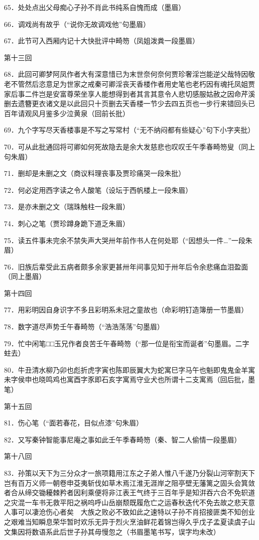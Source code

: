 65．处处点出父母痴心子孙不肖此书纯系自愧而成{（\kaishu 墨眉）}

66．调戏尚有故乎{（\kaishu ``说你无故调戏他''句墨眉）}

67．此节可入西厢内记十大快批评中畸笏{（\kaishu 凤姐泼粪一段墨眉）}

第十三回

68．此回可卿梦阿凤作者大有深意惜已为末世奈何奈何贾珍奢淫岂能逆父哉特因敬老不管然后恣意足为世家之戒秦可卿淫丧天香楼作者用史笔也老朽因有魂托凤姐贾家后事二件岂是安富尊荣坐享人能想得到者其言其意令人悲切感服姑赦之因命芹溪删去遗簪更衣诸文是以此回只十页删去天香楼一节少去四五页也一步行来错回头已百年请观风月鉴多少泣黄泉{（\kaishu 回前长批）}

69．九个字写尽天香楼事是不写之写常村{（\kaishu ``无不纳闷都有些疑心''句下小字夹批）}

70．可从此批通回将可卿如何死故隐去是余大发慈悲也叹叹壬午季春畸笏叟{（\kaishu 同上句朱眉）}

71．删却是未删之文{（\kaishu 商议料理丧事及贾珍痛哭一段朱批）}

72．何必定用西字读之令人酸笔{（\kaishu 设坛于西帆楼上一段朱眉）}

73．是亦未删之文{（\kaishu 瑞珠触柱一段朱眉）}

74．刺心之笔{（\kaishu 贾珍蹲身跪下道乏朱眉）}

75．读五件事未完余不禁失声大哭卅年前作书人在何处耶{（\kaishu ``因想头一件\ldots{}''一段朱眉）}

76．旧族后辈受此五病者颇多余家更甚卅年间事见知于卅年后令余悲痛血泪盈面{（\kaishu 同上墨眉）}

第十四回

77．用彩明因自身识字不多且彩明系未冠之童故也{（\kaishu 命彩明钉造簿册一节墨眉）}

78．数字道尽声势壬午春畸笏{（\kaishu ``浩浩荡荡''句墨眉）}

79．忙中闲笔□□玉兄作者良苦壬午春畸笏{（\kaishu ``那一位是衔宝而诞者''句墨眉。二字蛀去）}

80．牛丑清水柳乃卯也彪折虎字寅也陈即辰翼大为蛇寓巳字马午也魁即鬼鬼金羊寓未字侯申也晓鸣鸡也寓酉字豕即石亥字寓焉守业犬也所谓十二支寓焉{（\kaishu 回后批，墨笔）}

第十五回

81．伤心笔{（\kaishu ``面若春花，目似点漆''句朱眉）}

82．又写秦钟智能事尼庵之事如此壬午季春畸笏{（\kaishu 秦、智二人偷情一段墨眉）}

第十八回

83．孙策以天下为三分众才一旅项籍用江东之子弟人惟八千遂乃分裂山河宰割天下岂有百万义师一朝卷申芟夷斩伐如草木焉江淮无涯岸之阻亭壁无藩篱之固头会箕敛者合从缔交锄耰棘矜者因利乘便将非江表王气终于三百年乎是知洴吞六合不免轵道之灾混一车书无救平阳之祸呜呼山岳崩颓既履危亡之运春秋迭代不免去故之悲天意人事可以凄沧伤心者矣　大族之败必不致如此之速特以子孙不肖招接匪类不知创业之艰难当知瞬息荣华暂时欢乐无异于烈火烹油鲜花着锦岂得久乎戊子孟夏读虞子山文集因将数语系此后世子孙其毋慢忽之{（\kaishu 书眉墨笔书写，误字均未改）}

